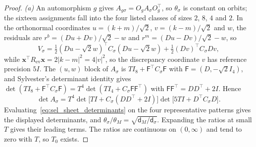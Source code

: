 \begin{proof}
\emph{(a)} An automorphism $g$ gives $A_{g\sigma}=O_gA_\sigma O_g^\top$, so $\theta_\sigma$ is constant on orbits; the sixteen assignments fall into the four listed classes of sizes $2$, $8$, $4$ and $2$. In the orthonormal coordinates $u=(k+m)/\sqrt2$, $v=(k-m)/\sqrt2$ and $w$, the residuals are $r^b=(Du+Dv)/\sqrt2-w$ and $r^m=(Du-Dv)/\sqrt2-w$, so
\[
V_\sigma=\tfrac12(Du-\sqrt2w)^\top C_\sigma(Du-\sqrt2w)+\tfrac12(Dv)^\top C_\sigma Dv,
\]
while $\mathbf x^\top R_{\mathrm{ev}}\mathbf x=2|k-m|^2=4|v|^2$, so the discrepancy coordinate $v$ has reference precision $5I$. The $(u,w)$ block of $A_\sigma$ is $TI_8+\mathsf F^\top C_\sigma\mathsf F$ with $\mathsf F=(D,-\sqrt2I_4)$, and Sylvester's determinant identity gives $\det(TI_8+\mathsf F^\top C_\sigma\mathsf F)=T^4\det(TI_4+C_\sigma\mathsf F\mathsf F^\top)$ with $\mathsf F\mathsf F^\top=DD^\top+2I$. Hence
\begin{equation}
\det A_\sigma=T^4\det\bigl[TI+C_\sigma(DD^\top+2I)\bigr]\det\bigl[5TI+D^\top C_\sigma D\bigr].
\label{eq:sel_sheet_determinants}
\end{equation}
Evaluating~\eqref{eq:sel_sheet_determinants} on the four representative patterns gives the displayed determinants, and $\theta_\sigma/\theta_M=\sqrt{\mathsf d_M/\mathsf d_\sigma}$. Expanding the ratios at small $T$ gives their leading terms. The ratios are continuous on $(0,\infty)$ and tend to zero with $T$, so $T_0$ exists.


\end{proof}
